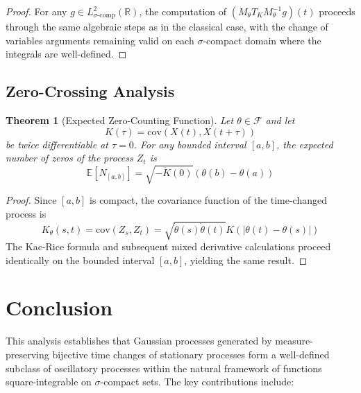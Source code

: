\documentclass{article}
\newtheorem{theorem}{Theorem}[section]
\begin{document}
\begin{proof}
For any $g \in L^2_{\sigma\text{-comp}}(\mathbb{R})$, the computation of $(M_{\theta} T_K M_{\theta}^{-1} g)(t)$ proceeds through the same algebraic steps as in the classical case, with the change of variables arguments remaining valid on each $\sigma$-compact domain where the integrals are well-defined.
\end{proof}

\subsection{Zero-Crossing Analysis}

\begin{theorem}[Expected Zero-Counting Function]\label{thm:zero_count}
Let $\theta \in \mathcal{F}$ and let
\begin{equation}
K(\tau) = \mathrm{cov}(X(t), X(t+\tau))
\end{equation}
be twice differentiable at $\tau = 0$. For any bounded interval $[a,b]$, the expected number of zeros of the process $Z_t$ is
\begin{equation}
\label{eq:zero_count}
\mathbb{E}[N_{[a,b]}] = \sqrt{-\ddot{K}(0)} (\theta(b) - \theta(a))
\end{equation}
\end{theorem}

\begin{proof}
Since $[a,b]$ is compact, the covariance function of the time-changed process is
\begin{equation}
\label{eq:time_changed_cov}
K_{\theta}(s,t) = \mathrm{cov}(Z_s, Z_t) = \sqrt{\dot{\theta}(s) \dot{\theta}(t)} K(|\theta(t) - \theta(s)|)
\end{equation}
The Kac-Rice formula and subsequent mixed derivative calculations proceed identically on the bounded interval $[a,b]$, yielding the same result.
\end{proof}

\section{Conclusion}

This analysis establishes that Gaussian processes generated by measure-preserving bijective time changes of stationary processes form a well-defined subclass of oscillatory processes within the natural framework of functions square-integrable on $\sigma$-compact sets. The key contributions include:
\end{document}
